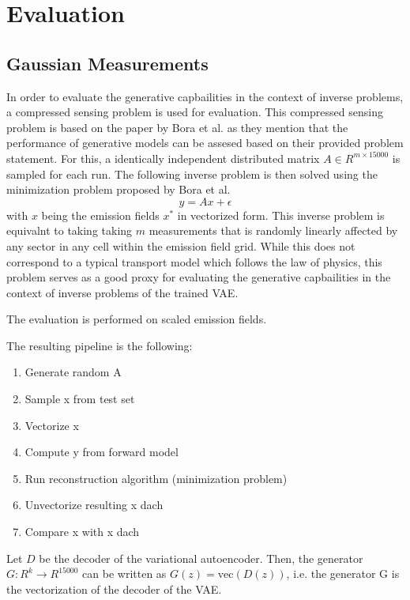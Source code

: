 \section{Evaluation}

\subsection{Gaussian Measurements}
In order to evaluate the generative capbailities in the context of inverse problems, a compressed sensing problem is used for evaluation.
This compressed sensing problem is based on the paper by Bora et al. as they mention that the performance of generative models can be assesed based on their provided problem statement.
For this, a identically independent distributed matrix $A \in R^{m \times 15000}$ is sampled for each run.
The following inverse problem is then solved using the minimization problem proposed by Bora et al.
\begin{equation}
    y = A x + \epsilon
\end{equation}
with $x$ being the emission fields $x^*$ in vectorized form.
This inverse problem is equivalnt to taking taking $m$ measurements that is randomly linearly affected by any sector in any cell within the emission field grid.
While this does not correspond to a typical transport model which follows the law of physics, this problem serves as a good proxy for evaluating the generative capbailities in the context of inverse problems of the trained VAE. 

The evaluation is performed on scaled emission fields.

The resulting pipeline is the following:
\begin{enumerate}
    \item Generate random A
    \item Sample x from test set
    \item Vectorize x
    \item Compute y from forward model
    \item Run reconstruction algorithm (minimization problem)
    \item Unvectorize resulting x dach
    \item Compare x with x dach
\end{enumerate}

Let $D$ be the decoder of the variational autoencoder.
Then, the generator $G: R^k \rightarrow R^{15000}$ can be written as $G(z) = \text{vec}(D(z))$, i.e. the generator G is the vectorization of the decoder of the VAE.

